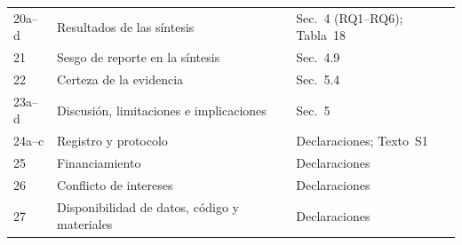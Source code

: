 \documentclass[12pt, a4paper]{article}
\begin{document}
\begin{small}
\begin{longtable}{lP{8.8cm}P{4.0cm}}
20a--d & Resultados de las síntesis & Sec.~4 (RQ1--RQ6); Tabla~18 \\
21 & Sesgo de reporte en la síntesis & Sec.~4.9 \\
22 & Certeza de la evidencia & Sec.~5.4 \\
23a--d & Discusión, limitaciones e implicaciones & Sec.~5 \\
24a--c & Registro y protocolo & Declaraciones; Texto~S1 \\
25 & Financiamiento & Declaraciones \\
26 & Conflicto de intereses & Declaraciones \\
27 & Disponibilidad de datos, código y materiales & Declaraciones \\
\end{longtable}
\end{small}



\end{document}
